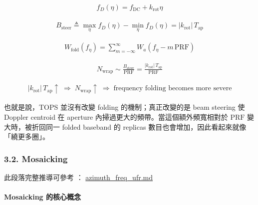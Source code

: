 \documentclass[11pt]{article}
\begin{document}
\begin{equation}
\begin{aligned}
f_D(\eta)=f_{\mathrm{DC}}+k_{\mathrm{rot}}\eta
\end{aligned}
\end{equation}

\begin{equation}
\begin{aligned}
B_{\mathrm{steer}}
\triangleq
\max_{\eta}f_D(\eta)-\min_{\eta}f_D(\eta)
=|k_{\mathrm{rot}}|\,T_{\mathrm{ap}}
\end{aligned}
\end{equation}

\begin{equation}
\begin{aligned}
W_{\mathrm{fold}}(f_\eta)
=\sum_{m=-\infty}^{\infty}
W_a\left(f_\eta-m\,\mathrm{PRF}\right)
\end{aligned}
\end{equation}

\begin{equation}
\begin{aligned}
N_{\mathrm{wrap}}
\sim
\frac{B_{\mathrm{steer}}}{\mathrm{PRF}}
=\frac{|k_{\mathrm{rot}}|\,T_{\mathrm{ap}}}{\mathrm{PRF}}
\end{aligned}
\end{equation}

\begin{equation}
\begin{aligned}
|k_{\mathrm{rot}}|\,T_{\mathrm{ap}}\uparrow
\;\Longrightarrow\;
N_{\mathrm{wrap}}\uparrow
\;\Longrightarrow\;
\text{frequency folding becomes more severe}
\end{aligned}
\end{equation}

也就是說，TOPS 並沒有改變 folding 的機制；真正改變的是 beam steering 使
Doppler centroid 在 aperture 內掃過更大的頻帶。當這個額外頻寬相對於
\(\mathrm{PRF}\) 變大時，被折回同一 folded baseband 的 replicas
數目也會增加，因此看起來就像「繞更多圈」。

\hypertarget{mosaicking}{%
\subsubsection{3.2. Mosaicking}\label{mosaicking}}

此段落完整推導可參考 ：
\href{./azimuth_freq_ufr.md}{azimuth\_freq\_ufr.md}

\hypertarget{mosaicking-ux7684ux6838ux5fc3ux6982ux5ff5}{%
\paragraph{Mosaicking
的核心概念}\label{mosaicking-ux7684ux6838ux5fc3ux6982ux5ff5}}
\end{document}
